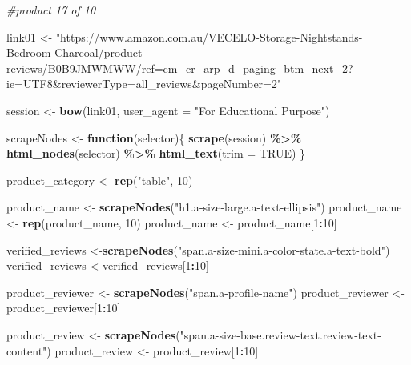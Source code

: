 \documentclass[
]{article}
\newenvironment{Shaded}{\begin{snugshade}}{\end{snugshade}}
\newcommand{\AttributeTok}[1]{\textcolor[rgb]{0.13,0.29,0.53}{#1}}
\newcommand{\CommentTok}[1]{\textcolor[rgb]{0.56,0.35,0.01}{\textit{#1}}}
\newcommand{\ConstantTok}[1]{\textcolor[rgb]{0.56,0.35,0.01}{#1}}
\newcommand{\ControlFlowTok}[1]{\textcolor[rgb]{0.13,0.29,0.53}{\textbf{#1}}}
\newcommand{\DecValTok}[1]{\textcolor[rgb]{0.00,0.00,0.81}{#1}}
\newcommand{\FunctionTok}[1]{\textcolor[rgb]{0.13,0.29,0.53}{\textbf{#1}}}
\newcommand{\NormalTok}[1]{#1}
\newcommand{\OtherTok}[1]{\textcolor[rgb]{0.56,0.35,0.01}{#1}}
\newcommand{\SpecialCharTok}[1]{\textcolor[rgb]{0.81,0.36,0.00}{\textbf{#1}}}
\newcommand{\StringTok}[1]{\textcolor[rgb]{0.31,0.60,0.02}{#1}}
\begin{document}
\begin{Shaded}
\begin{Highlighting}[]
\CommentTok{\#product 17 of 10}

\NormalTok{link01 }\OtherTok{\textless{}{-}} \StringTok{"https://www.amazon.com.au/VECELO{-}Storage{-}Nightstands{-}Bedroom{-}Charcoal/product{-}reviews/B0B9JMWMWW/ref=cm\_cr\_arp\_d\_paging\_btm\_next\_2?ie=UTF8\&reviewerType=all\_reviews\&pageNumber=2"}


\NormalTok{  session }\OtherTok{\textless{}{-}} \FunctionTok{bow}\NormalTok{(link01,}
               \AttributeTok{user\_agent =} \StringTok{"For Educational Purpose"}\NormalTok{)}

\NormalTok{  scrapeNodes }\OtherTok{\textless{}{-}} \ControlFlowTok{function}\NormalTok{(selector)\{}
    \FunctionTok{scrape}\NormalTok{(session) }\SpecialCharTok{\%\textgreater{}\%}
      \FunctionTok{html\_nodes}\NormalTok{(selector) }\SpecialCharTok{\%\textgreater{}\%}
      \FunctionTok{html\_text}\NormalTok{(}\AttributeTok{trim =} \ConstantTok{TRUE}\NormalTok{)}
\NormalTok{  \}}

\NormalTok{  product\_category }\OtherTok{\textless{}{-}} \FunctionTok{rep}\NormalTok{(}\StringTok{"table"}\NormalTok{, }\DecValTok{10}\NormalTok{)}

\NormalTok{  product\_name }\OtherTok{\textless{}{-}} \FunctionTok{scrapeNodes}\NormalTok{(}\StringTok{"h1.a{-}size{-}large.a{-}text{-}ellipsis"}\NormalTok{)}
\NormalTok{  product\_name }\OtherTok{\textless{}{-}} \FunctionTok{rep}\NormalTok{(product\_name, }\DecValTok{10}\NormalTok{)}
\NormalTok{  product\_name }\OtherTok{\textless{}{-}}\NormalTok{ product\_name[}\DecValTok{1}\SpecialCharTok{:}\DecValTok{10}\NormalTok{]}
  
\NormalTok{  verified\_reviews }\OtherTok{\textless{}{-}}\FunctionTok{scrapeNodes}\NormalTok{(}\StringTok{"span.a{-}size{-}mini.a{-}color{-}state.a{-}text{-}bold"}\NormalTok{)}
\NormalTok{  verified\_reviews }\OtherTok{\textless{}{-}}\NormalTok{verified\_reviews[}\DecValTok{1}\SpecialCharTok{:}\DecValTok{10}\NormalTok{]}
  
\NormalTok{  product\_reviewer }\OtherTok{\textless{}{-}} \FunctionTok{scrapeNodes}\NormalTok{(}\StringTok{"span.a{-}profile{-}name"}\NormalTok{)}
\NormalTok{  product\_reviewer }\OtherTok{\textless{}{-}}\NormalTok{ product\_reviewer[}\DecValTok{1}\SpecialCharTok{:}\DecValTok{10}\NormalTok{]}
  
\NormalTok{  product\_review }\OtherTok{\textless{}{-}} \FunctionTok{scrapeNodes}\NormalTok{(}\StringTok{"span.a{-}size{-}base.review{-}text.review{-}text{-}content"}\NormalTok{)}
\NormalTok{  product\_review }\OtherTok{\textless{}{-}}\NormalTok{ product\_review[}\DecValTok{1}\SpecialCharTok{:}\DecValTok{10}\NormalTok{]}
  

\end{Highlighting}
\end{Shaded}
\end{document}
